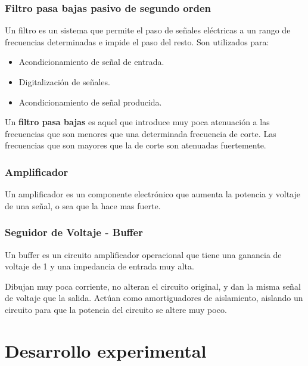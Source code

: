 \documentclass[12pt]{article}
\begin{document}
        	    \subsubsection{Filtro pasa bajas pasivo de segundo orden}
                Un filtro es un sistema que permite el paso de señales eléctricas a un  rango de frecuencias determinadas e impide el paso del resto. Son utilizados para:
                \begin{itemize}
                    \item Acondicionamiento de señal de entrada.
                    \item Digitalización de señales.
                    \item Acondicionamiento de señal producida.
                \end{itemize}
                Un \textbf{filtro pasa bajas} es aquel que introduce muy poca atenuación a las frecuencias que son menores que una determinada frecuencia de corte. Las frecuencias que son mayores que la de corte son atenuadas fuertemente.
                
                \subsubsection{Amplificador}
                
                Un amplificador es un componente electrónico que aumenta la potencia y voltaje de una señal, o sea que la hace mas fuerte.
                
                \subsubsection{Seguidor de Voltaje - Buffer}
                
                Un buffer es un circuito amplificador operacional que tiene una ganancia de voltaje de 1 y una impedancia de entrada muy alta.
                
                Dibujan muy poca corriente, no alteran el circuito original, y dan la misma señal de voltaje que la salida. Actúan como amortiguadores de aislamiento, aislando un circuito para que la potencia del circuito se altere muy poco. 
\newpage

	\section{Desarrollo experimental}
	  
\end{document}
